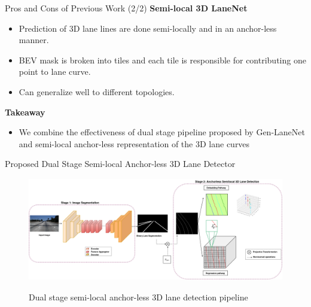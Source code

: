 \documentclass[aspectratio=169]{beamer}
\begin{document}
\begin{frame}{Pros and Cons of Previous Work (2/2)}
    \textbf{Semi-local 3D LaneNet}
    \begin{itemize}
        \item Prediction of 3D lane lines are done semi-locally and in an anchor-less manner. 
        \item BEV mask is broken into tiles and each tile is responsible for contributing one point to lane curve.
        \item Can generalize well to different topologies.
    \end{itemize}


\textbf{Takeaway}
\begin{itemize}
    \item We combine the effectiveness of dual stage pipeline proposed by Gen-LaneNet and semi-local anchor-less representation of the 3D lane curves  
\end{itemize}
\end{frame}

\begin{frame}{Proposed Dual Stage Semi-local Anchor-less 3D Lane Detector}


 \begin{figure}[H]
     \centering
     
\includegraphics[width=0.8\linewidth, height=4.5cm]{images/3DlaneAUXNet.png} 
\label{fig:subim1}

\caption{Dual stage semi-local anchor-less 3D lane detection pipeline }
\label{fig:image2}
\end{figure}
\end{frame}

\end{document}
